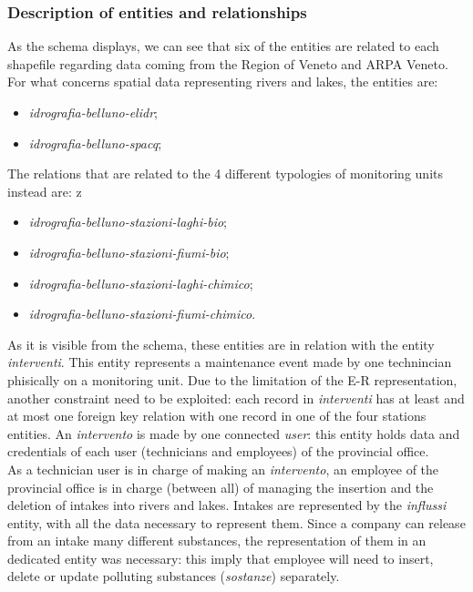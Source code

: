\subsubsection{Description of entities and relationships}
As the schema displays, we can see that six of the entities are related to each shapefile regarding data coming from the Region of Veneto and ARPA Veneto.
For what concerns spatial data representing rivers and lakes, the entities are:
\begin{itemize}
    \item \textit{idrografia-belluno-elidr};
    \item \textit{idrografia-belluno-spacq};
\end{itemize}
The relations that are related to the 4 different typologies of monitoring units instead are:
z\begin{itemize}
    \item \textit{idrografia-belluno-stazioni-laghi-bio};
    \item \textit{idrografia-belluno-stazioni-fiumi-bio};
    \item \textit{idrografia-belluno-stazioni-laghi-chimico};
    \item \textit{idrografia-belluno-stazioni-fiumi-chimico}.
\end{itemize}
As it is visible from the schema, these entities are in relation with the entity \textit{interventi}. This entity represents a maintenance event made by one technincian phisically on a monitoring unit. Due to the limitation of the E-R representation, another constraint need to be exploited: each record in \textit{interventi} has at least and at most one foreign key relation with one record in one of the four stations entities.
An \textit{intervento} is made by one connected \textit{user}: this entity holds data and credentials of each user (technicians and employees) of the provincial office. \\
As a technician user is in charge of making an \textit{intervento}, an employee of the provincial office is in charge (between all) of managing the insertion and the deletion of intakes into rivers and lakes. Intakes are represented by the \textit{influssi} entity, with all the data necessary to represent them. Since a company can release from an intake many different substances, the representation of them in an dedicated entity was necessary: this imply that employee will need to insert, delete or update polluting substances (\textit{sostanze}) separately. \\

